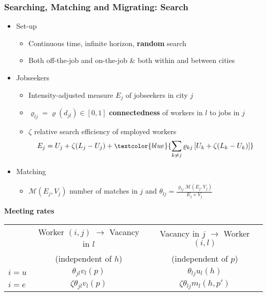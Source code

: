 \documentclass{beamer}
\newcommand{\1}{\mathbb{1}}
\begin{document}
\begin{frame}\frametitle{Searching, Matching and Migrating: Search}
\begin{itemize}
\item Set-up
\begin{itemize}
\item Continuous time, infinite horizon, \textbf{random} search
\item Both off-the-job and on-the-job \& both within and between cities
\end{itemize}\medskip
\item Jobseekers
\begin{itemize}
\item Intensity-adjusted measure $E_j$ of jobseekers in city $j$
\item $\varrho_{lj}=\varrho(d_{jl})\in[0,1]$ \textbf{connectedness} of workers in $l$ to jobs in $j$
\item $\zeta$ relative search efficiency of employed workers
\begin{equation*}
\small{E_j=U_j+\zeta(L_j-U_j)+\textcolor{blue}{\sum_{k\neq j}\varrho_{kj} \left[U_k+\zeta(L_k-U_k)\right]}}
\end{equation*}
\end{itemize}
\vspace{-0.5cm}
\item Matching
\begin{itemize}
\item $\mathcal{M}(E_j,V_j)$ number of matches in $j$ and $\theta_{lj}=\tfrac{\varrho_{lj} \mathcal{M}(E_j,V_j)}{E_j\times V_j}$
\end{itemize}
\end{itemize}
\centering
\textbf{Meeting rates}
\begin{tabular}{|l|c|c|}
\hline
& \small{Worker $(i,j)$ $\rightarrow$ Vacancy in $l$} & \small{Vacancy in $j$ $\rightarrow$ Worker $(i,l)$} \\[-1ex]
& \small{(independent of $h$)} & \small{(independent of $p$)}\\
\hline
$i=u$ & $\theta_{jl}v_l(p)$ & $\theta_{lj}u_l(h)$\\\hline
$i=e$ & $\zeta\theta_{jl}v_l(p)$ & $\zeta\theta_{lj}m_l(h,p')$\\\hline
\end{tabular}
\end{frame}
\end{document}
